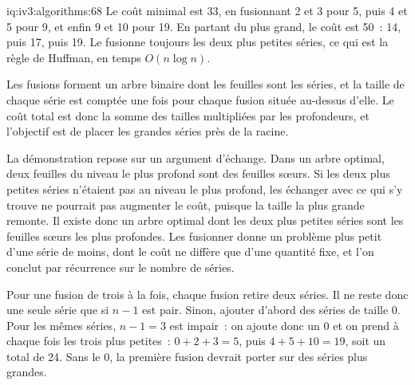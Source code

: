 \begin{solution}{iq:iv3:algorithms:68}
Le coût minimal est 33, en fusionnant 2 et 3 pour 5, puis 4 et 5 pour 9, et enfin 9 et 10 pour 19. En partant du plus grand, le coût est 50~: 14, puis 17, puis 19. Le  fusionne toujours les deux plus petites séries, ce qui est la règle de Huffman, en temps $O(n \log n)$.
\label{lst:iv3:al:mergeruns}

Les fusions forment un arbre binaire dont les feuilles sont les séries, et la taille de chaque série est comptée une fois pour chaque fusion située au-dessus d'elle. Le coût total est donc la somme des tailles multipliées par les profondeurs, et l'objectif est de placer les grandes séries près de la racine.

La démonstration repose sur un argument d'échange. Dans un arbre optimal, deux feuilles du niveau le plus profond sont des feuilles sœurs. Si les deux plus petites séries n'étaient pas au niveau le plus profond, les échanger avec ce qui s'y trouve ne pourrait pas augmenter le coût, puisque la taille la plus grande remonte. Il existe donc un arbre optimal dont les deux plus petites séries sont les feuilles sœurs les plus profondes. Les fusionner donne un problème plus petit d'une série de moins, dont le coût ne diffère que d'une quantité fixe, et l'on conclut par récurrence sur le nombre de séries.

Pour une fusion de trois à la fois, chaque fusion retire deux séries. Il ne reste donc une seule série que si $n - 1$ est pair. Sinon, ajouter d'abord des séries de taille 0. Pour les mêmes séries, $n - 1 = 3$ est impair~: on ajoute donc un 0 et on prend à chaque fois les trois plus petites~: $0 + 2 + 3 = 5$, puis $4 + 5 + 10 = 19$, soit un total de 24. Sans le 0, la première fusion devrait porter sur des séries plus grandes.

\end{solution}


